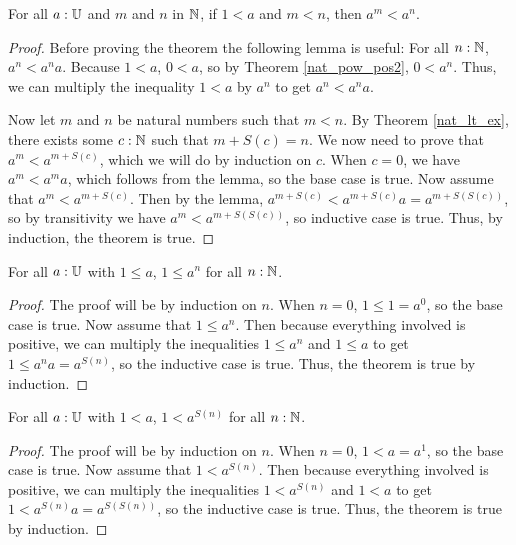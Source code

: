 \documentclass[../math.tex]{subfiles}
\begin{document}
\begin{theorem}
    For all $a : \mathbb{U}$ and $m$ and $n$ in $\mathbb{N}$, if $1 < a$ and $m < n$, then $a^m
    < a^n$.
\end{theorem}
\begin{proof}
    Before proving the theorem the following lemma is useful: For all $n : \mathbb{N}$,
    $a^n < a^na$.  Because $1 < a$, $0 < a$, so by Theorem \ref{nat_pow_pos2},
    $0 < a^n$.  Thus, we can multiply the inequality $1 < a$ by $a^n$ to get
    $a^n < a^na$.

    Now let $m$ and $n$ be natural numbers such that $m < n$.  By Theorem
    \ref{nat_lt_ex}, there exists some $c : \mathbb{N}$ such that $m + S(c) = n$.  We
    now need to prove that $a^m < a^{m + S(c)}$, which we will do by induction
    on $c$.  When $c = 0$, we have $a^m < a^ma$, which follows from the lemma,
    so the base case is true.  Now assume that $a^m < a^{m + S(c)}$.  Then by
    the lemma, $a^{m + S(c)} < a^{m + S(c)}a = a^{m + S(S(c))}$, so by
    transitivity we have $a^m < a^{m + S(S(c))}$, so inductive case is true.
    Thus, by induction, the theorem is true.
\end{proof}

\begin{theorem} \label{nat_pow_le_one}
    For all $a : \mathbb{U}$ with $1 \leq a$, $1 \leq a^n$ for all $n : \mathbb{N}$.
\end{theorem}
\begin{proof}
    The proof will be by induction on $n$.  When $n = 0$, $1 \leq 1 = a^0$, so
    the base case is true.  Now assume that $1 \leq a^n$.  Then because
    everything involved is positive, we can multiply the inequalities $1 \leq
    a^n$ and $1 \leq a$ to get $1 \leq a^na = a^{S(n)}$, so the inductive case
    is true.  Thus, the theorem is true by induction.
\end{proof}

\begin{theorem} \label{nat_pow_lt_one}
    For all $a : \mathbb{U}$ with $1 < a$, $1 < a^{S(n)}$ for all $n : \mathbb{N}$.
\end{theorem}
\begin{proof}
    The proof will be by induction on $n$.  When $n = 0$, $1 < a = a^1$, so the
    base case is true.  Now assume that $1 < a^{S(n)}$.  Then because everything
    involved is positive, we can multiply the inequalities $1 < a^{S(n)}$ and $1
    < a$ to get $1 < a^{S(n)}a = a^{S(S(n))}$, so the inductive case is true.
    Thus, the theorem is true by induction.
\end{proof}
\end{document}
